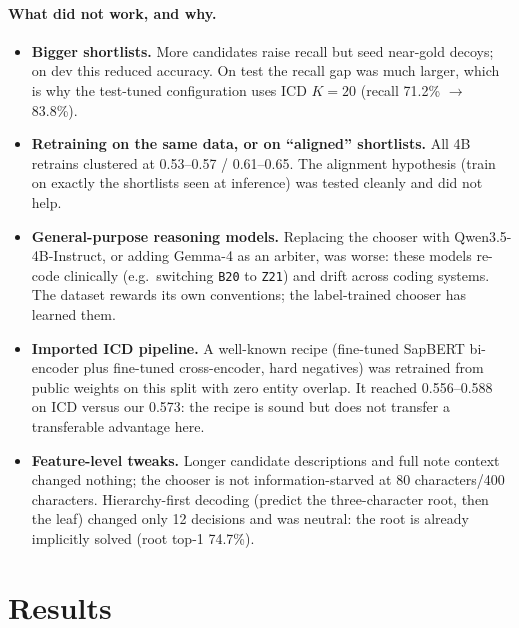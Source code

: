 \documentclass[11pt]{article}
\newcommand{\code}[1]{\texttt{#1}}
\begin{document}
\paragraph{What did not work, and why.}
\begin{itemize}[leftmargin=1.2em]
  \item \textbf{Bigger shortlists.} More candidates raise recall but seed near-gold decoys;
  on dev this reduced accuracy. On test the recall gap was much larger, which is why the
  test-tuned configuration uses ICD $K{=}20$ (recall 71.2\% $\rightarrow$ 83.8\%).
  \item \textbf{Retraining on the same data, or on ``aligned'' shortlists.} All 4B retrains
  clustered at 0.53--0.57 / 0.61--0.65. The alignment hypothesis (train on exactly the
  shortlists seen at inference) was tested cleanly and did not help.
  \item \textbf{General-purpose reasoning models.} Replacing the chooser with
  Qwen3.5-4B-Instruct, or adding Gemma-4 as an arbiter, was worse: these models re-code
  clinically (e.g.\ switching \code{B20} to \code{Z21}) and drift across coding systems.
  The dataset rewards its own conventions; the label-trained chooser has learned them.
  \item \textbf{Imported ICD pipeline.} A well-known recipe (fine-tuned SapBERT bi-encoder
  plus fine-tuned cross-encoder, hard negatives) was retrained from public weights on this
  split with zero entity overlap. It reached 0.556--0.588 on ICD versus our 0.573: the
  recipe is sound but does not transfer a transferable advantage here.
  \item \textbf{Feature-level tweaks.} Longer candidate descriptions and full note context
  changed nothing; the chooser is not information-starved at 80 characters/400 characters.
  Hierarchy-first decoding (predict the three-character root, then the leaf) changed only 12
  decisions and was neutral: the root is already implicitly solved (root top-1 74.7\%).
\end{itemize}

\section{Results}
\end{document}
